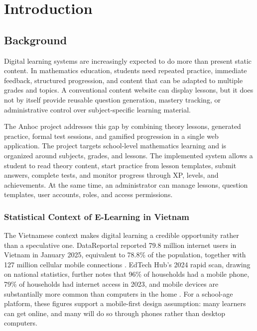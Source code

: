\chapter{Introduction}

\section{Background}

Digital learning systems are increasingly expected to do more than present static content. In mathematics education, students need repeated practice, immediate feedback, structured progression, and content that can be adapted to multiple grades and topics. A conventional content website can display lessons, but it does not by itself provide reusable question generation, mastery tracking, or administrative control over subject-specific learning material.

The Anhoc project addresses this gap by combining theory lessons, generated practice, formal test sessions, and gamified progression in a single web application. The project targets school-level mathematics learning and is organized around subjects, grades, and lessons. The implemented system allows a student to read theory content, start practice from lesson templates, submit answers, complete tests, and monitor progress through XP, levels, and achievements. At the same time, an administrator can manage lessons, question templates, user accounts, roles, and access permissions.

\subsection{Statistical Context of E-Learning in Vietnam}

The Vietnamese context makes digital learning a credible opportunity rather than a speculative one. DataReportal reported 79.8 million internet users in Vietnam in January 2025, equivalent to 78.8\% of the population, together with 127 million cellular mobile connections \cite{datareportal-vietnam-2025}. EdTech Hub's 2024 rapid scan, drawing on national statistics, further notes that 96\% of households had a mobile phone, 79\% of households had internet access in 2023, and mobile devices are substantially more common than computers in the home \cite{edtechhub-vietnam-scan}. For a school-age platform, these figures support a mobile-first design assumption: many learners can get online, and many will do so through phones rather than desktop computers.

